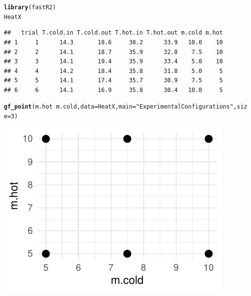 \documentclass[twoside]{book}\usepackage[]{graphicx}\usepackage[]{xcolor}
\makeatletter
\def\maxwidth{ %
  \ifdim\Gin@nat@width>\linewidth
    \linewidth
  \else
    \Gin@nat@width
  \fi
}
\newcommand{\hlnum}[1]{\textcolor[rgb]{0.686,0.059,0.569}{#1}}%
\newcommand{\hlstr}[1]{\textcolor[rgb]{0.192,0.494,0.8}{#1}}%
\newcommand{\hlopt}[1]{\textcolor[rgb]{0,0,0}{#1}}%
\newcommand{\hlstd}[1]{\textcolor[rgb]{0.345,0.345,0.345}{#1}}%
\newcommand{\hlkwc}[1]{\textcolor[rgb]{0.333,0.667,0.333}{#1}}%
\newcommand{\hlkwd}[1]{\textcolor[rgb]{0.737,0.353,0.396}{\textbf{#1}}}%
\newenvironment{kframe}{%
 \def\at@end@of@kframe{}%
 \ifinner\ifhmode%
  \def\at@end@of@kframe{\end{minipage}}%
  \begin{minipage}{\columnwidth}%
 \fi\fi%
 \def\FrameCommand##1{\hskip\@totalleftmargin \hskip-\fboxsep
 \colorbox{shadecolor}{##1}\hskip-\fboxsep
     \hskip-\linewidth \hskip-\@totalleftmargin \hskip\columnwidth}%
 \MakeFramed {\advance\hsize-\width
   \@totalleftmargin\z@ \linewidth\hsize
   \@setminipage}}%
 {\par\unskip\endMakeFramed%
 \at@end@of@kframe}
\newenvironment{knitrout}{}{} %
\newcommand{\Rindex}[1]{\index{\texttt{#1}}}
\newcommand{\function}[1]{{\color{purple!75!blue}\texttt{\StrSubstitute{#1}{()}{}()}}\Rindex{#1}}
\def\tab#1{{\sf #1}}
\makeatother
\begin{document}
\begin{knitrout}
\color{fgcolor}\begin{kframe}
\begin{alltt}
\hlkwd{library}\hlstd{(fastR2)}
\hlstd{HeatX}
\end{alltt}
\begin{verbatim}
##   trial T.cold.in T.cold.out T.hot.in T.hot.out m.cold m.hot
## 1     1      14.3       18.6     38.2      33.9   10.0    10
## 2     2      14.1       18.7     35.9      32.8    7.5    10
## 3     3      14.1       19.4     35.9      33.4    5.0    10
## 4     4      14.2       18.4     35.8      31.8    5.0     5
## 5     5      14.1       17.4     35.7      30.9    7.5     5
## 6     6      14.1       16.9     35.8      30.4   10.0     5
\end{verbatim}
\begin{alltt}
\hlkwd{gf_point}\hlstd{(m.hot} \hlopt{~} \hlstd{m.cold,} \hlkwc{data} \hlstd{= HeatX,} \hlkwc{main} \hlstd{=} \hlstr{"Experimental Configurations"}\hlstd{,} \hlkwc{size} \hlstd{=} \hlnum{3}\hlstd{)}
\end{alltt}
\end{kframe}

{\centering \includegraphics[width=\maxwidth]{figures/fig-unnamed-chunk-332-1} 

}



\end{knitrout}

\end{document}
